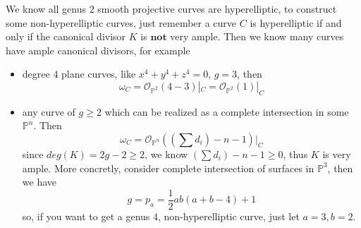 \documentclass[../main.tex]{subfiles}
\begin{document}
\begin{example}

\end{example}
\begin{example}
We know all genus $2$ smooth projective curves are hyperelliptic, to construct some non-hyperelliptic curves, just remember a curve $C$ is hyperelliptic if and only if the canonical divisor $K$ is $\mathbf{not}$ very ample. Then we know many curves have ample canonical divisors, for example
\begin{itemize}
\item degree $4$ plane curves, like $x^{4}+y^{4}+z^{4}=0$, $g=3$, then 
$$\omega_{C}=\mathcal{O}_{\mathbb{P}^{2}}(4-3)|_{C}=\mathcal{O}_{\mathbb{P}^{2}}(1)|_{C}$$
\item any curve of $g\geq 2$ which can be realized as a complete intersection in some $\mathbb{P}^{n}$. Then 
$$\omega_{C}=\mathcal{O}_{\mathbb{P}^{n}}((\sum d_{i})-n-1)|_{C}$$
since $deg(K)=2g-2\geq 2$, we know $(\sum d_{i})-n-1\geq 0$, thus $K$ is very ample. More concretly, consider complete intersection of surfaces in $\mathbb{P}^{3}$, then we have 
$$g=p_{a}=\frac{1}{2}ab(a+b-4)+1$$
so, if you want to get a genus $4$, non-hyperelliptic curve, just let $a=3,b=2$.
\end{itemize}
\end{example}
\end{document}
